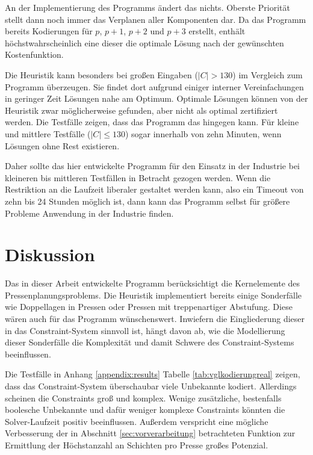 An der Implementierung des Programms ändert das nichts.
Oberste Priorität stellt dann noch immer das Verplanen aller Komponenten dar.
Da das Programm bereits Kodierungen für $p$, $p+1$, $p+2$ und $p+3$ erstellt, enthält höchstwahrscheinlich eine dieser die optimale Lösung nach der gewünschten Kostenfunktion.

Die Heuristik kann besonders bei großen Eingaben ($\lvert C \rvert > 130$) im Vergleich zum Programm überzeugen.
Sie findet dort aufgrund einiger interner Vereinfachungen in geringer Zeit Lösungen nahe am Optimum.
Optimale Lösungen können von der Heuristik zwar möglicherweise gefunden, aber nicht als optimal zertifiziert werden.
Die Testfälle zeigen, dass das Programm das hingegen kann.
Für kleine und mittlere Testfälle ($\lvert C \rvert \leq 130$) sogar innerhalb von zehn Minuten, wenn Lösungen ohne Rest existieren.

Daher sollte das hier entwickelte Programm für den Einsatz in der Industrie bei kleineren bis mittleren Testfällen in Betracht gezogen werden.
Wenn die Restriktion an die Laufzeit liberaler gestaltet werden kann, also ein Timeout von zehn bis 24 Stunden möglich ist, dann kann das Programm selbst für
größere Probleme Anwendung in der Industrie finden.

\section{Diskussion}
Das in dieser Arbeit entwickelte Programm berücksichtigt die Kernelemente des Pressenplanungsproblems.
Die Heuristik implementiert bereits einige Sonderfälle wie Doppellagen in Pressen oder Pressen mit treppenartiger Abstufung.
Diese wären auch für das Programm wünschenswert.
Inwiefern die Eingliederung dieser in das Constraint-System sinnvoll ist, hängt davon ab,
wie die Modellierung dieser Sonderfälle die Komplexität und damit Schwere des Constraint-Systems beeinflussen.

Die Testfälle in Anhang \ref{appendix:results} Tabelle \ref{tab:vglkodierungreal} zeigen, dass das Constraint-System überschaubar viele Unbekannte kodiert.
Allerdings scheinen die Constraints groß und komplex.
Wenige zusätzliche, bestenfalls boolesche Unbekannte und dafür weniger komplexe Constraints könnten die Solver-Laufzeit positiv beeinflussen.
Außerdem verspricht eine mögliche Verbesserung der in Abschnitt \ref{sec:vorverarbeitung} betrachteten Funktion zur Ermittlung der Höchstanzahl an Schichten pro Presse großes Potenzial.
